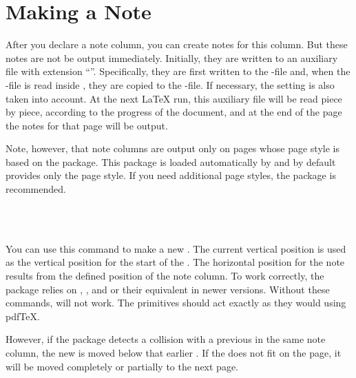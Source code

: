 \EndIndexGroup


\section{Making a Note}

After you declare a note column, you can create notes for this column. But
these notes are not be output immediately. Initially, they are written to an
auxiliary file with extension ``''. Specifically, they are first
written to the -file and, when the -file is read inside
, they are copied to the -file. If
necessary, the  setting is also taken into
account. At the next \LaTeX{} run, this auxiliary file will be read piece by
piece, according to the progress of the document, and at the end of the page
the notes for that page will be output.

Note, however, that note columns are output only on pages
whose page style is based on the 
package. This package is loaded automatically by 
and by default provides only the  page
style. If you need additional page styles, the
 package is
recommended.

\begin{Declaration}
  \\
  \\
\end{Declaration}
You can use this command to make a new . The current vertical
position is used as the vertical position for the start of the .
The horizontal position for the note results from the defined position of the
note column. To work correctly, the package relies on
,
, and
 or their equivalent in newer
\LuaTeX{} versions. Without these commands,  will
not work. The primitives should act exactly as they would using pdf\TeX.

However, if the package detects a collision with
a previous  in the same note column, the new  is moved
below that earlier . If the  does not fit on the
page, it will be moved completely or
partially to the next page.

